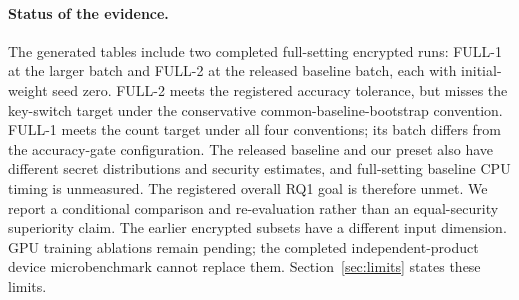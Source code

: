 \paragraph{Status of the evidence.}
The generated tables include two completed full-setting encrypted runs: FULL-1 at the larger batch and FULL-2 at the released baseline batch, each with initial-weight seed zero. FULL-2 meets the registered accuracy tolerance, but misses the key-switch target under the conservative common-baseline-bootstrap convention. FULL-1 meets the count target under all four conventions; its batch differs from the accuracy-gate configuration. The released baseline and our preset also have different secret distributions and security estimates, and full-setting baseline CPU timing is unmeasured. The registered overall RQ1 goal is therefore unmet. We report a conditional comparison and re-evaluation rather than an equal-security superiority claim. The earlier encrypted subsets have a different input dimension. GPU training ablations remain pending; the completed independent-product device microbenchmark cannot replace them. Section~\ref{sec:limits} states these limits.
